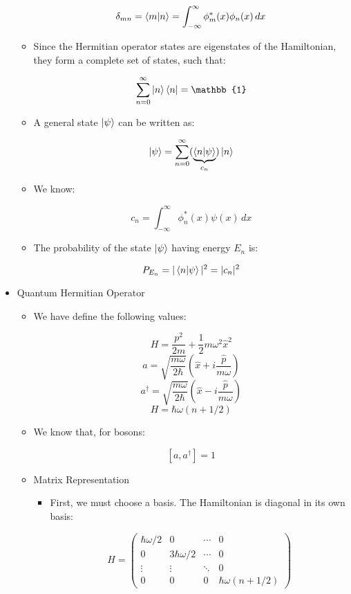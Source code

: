 \begin{itemize}
\begin{itemize}
        $$\delta_{mn}=\bra{m}\ket{n}=\int_{-\infty}^{\infty} \phi_m^*(x)\phi_n(x)\,dx$$

      \item Since the Hermitian operator states are eigenstates of the Hamiltonian, they form a complete set of states, such that:

        $$\sum_{n=0}^{\infty} \ket{n}\bra{n}=\mathbb{1}$$

      \item A general state $\ket{\psi}$ can be written as:

        $$\ket{\psi}=\sum_{n=0}^{\infty} (\underbrace{\bra{n}\ket{\psi}}_{c_n})\ket{n}$$

      \item We know:

        $$c_n=\int_{-\infty}^{\infty}\phi_n^*(x)\psi(x)\,dx$$

      \item The probability of the state $\ket{\psi}$ having energy $E_n$ is:

        $$P_{E_n}=|\bra{n}\ket{\psi}|^2=|c_n|^2$$

    \end{itemize}

  \item Quantum Hermitian Operator

    \begin{itemize}

      \item We have define the following values:

        $$H=\frac{p^2}{2m}+\frac{1}{2}m\omega^2\hat{x}^2$$
        $$a=\sqrt{\frac{m\omega}{2\hbar}}\left( \hat{x}+i\frac{\hat{p}}{m\omega} \right)$$
        $$a^{\dagger}=\sqrt{\frac{m\omega}{2\hbar}}\left( \hat{x}-i\frac{\hat{p}}{m\omega} \right)$$
        $$H=\hbar\omega\left( n+1/2 \right)$$

      \item We know that, for bosons:

        $$[a,a^{\dagger}]=1$$

      \item Matrix Representation

        \begin{itemize}

          \item First, we must choose a basis. The Hamiltonian is diagonal in its own basis:

            $$H=\left( \begin{matrix} \hbar\omega/2 & 0 & \cdots & 0\\ 0 & 3\hbar\omega/2 & \cdots & 0\\ \vdots & \vdots & \ddots & 0\\ 0 & 0 & 0 & \hbar\omega(n+1/2)\end{matrix}\right)$$


\end{itemize}
\end{itemize}
\end{itemize}
